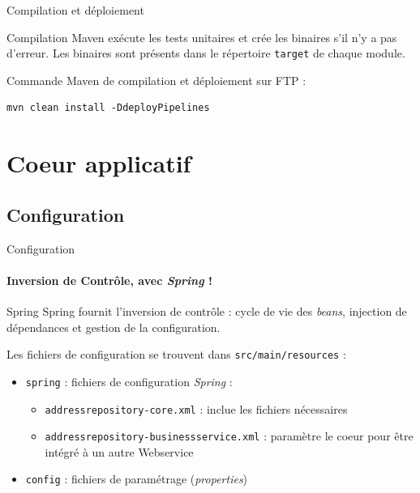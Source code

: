 \documentclass[compact]{beamer}%
\begin{document}
\begin{frame}[fragile]{Compilation et déploiement}

	\begin{block}{Compilation}
	Maven exécute les tests unitaires et crée les binaires s'il n'y a pas d'erreur. Les binaires sont présents dans le répertoire \texttt{target} de chaque module.
	\end{block}
	
	\pause
	Commande Maven de compilation et déploiement sur FTP :
	\begin{lstlisting}
mvn clean install -DdeployPipelines
	\end{lstlisting}

\end{frame}


\section{Coeur applicatif}

\subsection{Configuration}

\begin{frame}{Configuration}
	\framesubtitle{Inversion de Contrôle, avec \emph{Spring} !}
	
	\begin{block}{Spring}
	Spring fournit l'inversion de contrôle : cycle de vie des \emph{beans}, injection de dépendances et gestion de la configuration.
	\end{block}
	
	\pause
	Les fichiers de configuration se trouvent dans \texttt{src/main/resources} :
	\begin{itemize}[<+->]
	\item \texttt{spring} : fichiers de configuration \emph{Spring} :
		\begin{itemize}[<+->]
		\item \texttt{addressrepository-core.xml} : inclue les fichiers nécessaires
		\item \texttt{addressrepository-businessservice.xml} : paramètre le coeur pour être intégré à un autre Webservice
		\end{itemize}
	\item \texttt{config} : fichiers de paramétrage (\emph{properties})
	\end{itemize}
	
\end{frame}
\end{document}

